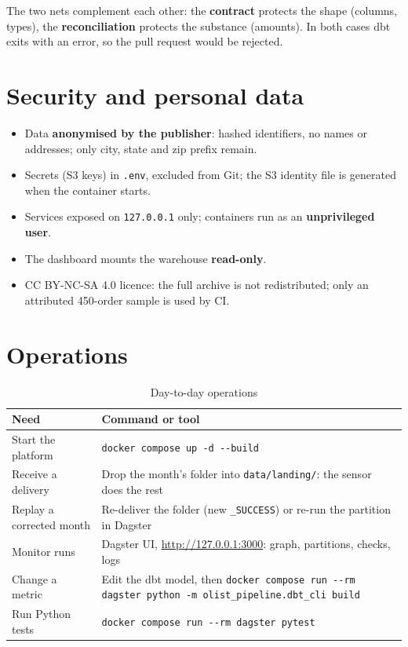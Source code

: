 \documentclass[11pt, a4paper, oneside, headings=normal, numbers=noenddot, DIV=12]{scrartcl}
\begin{document}
The two nets complement each other: the \textbf{contract} protects the shape (columns, types), the \textbf{reconciliation} protects the
substance (amounts). In both cases dbt exits with an error, so the pull request would be rejected.

\section{Security and personal data}
\begin{itemize}[leftmargin=1.2em]
  \item Data \textbf{anonymised by the publisher}: hashed identifiers, no names or addresses; only city, state and zip prefix remain.
  \item Secrets (S3 keys) in \texttt{.env}, excluded from Git; the S3 identity file is generated when the container starts.
  \item Services exposed on \texttt{127.0.0.1} only; containers run as an \textbf{unprivileged user}.
  \item The dashboard mounts the warehouse \textbf{read-only}.
  \item CC BY-NC-SA 4.0 licence: the full archive is not redistributed; only an attributed 450-order sample is used by CI.
\end{itemize}

\section{Operations}
\begin{table}[H]
\centering\small
\begin{tabularx}{\linewidth}{@{}L{4.6cm} Y@{}}
\toprule
\textbf{Need} & \textbf{Command or tool} \\
\midrule
Start the platform & \texttt{docker compose up -d -{}-build} \\
Receive a delivery & Drop the month's folder into \texttt{data/landing/}: the sensor does the rest \\
Replay a corrected month & Re-deliver the folder (new \texttt{\_SUCCESS}) or re-run the partition in Dagster \\
Monitor runs & Dagster UI, \url{http://127.0.0.1:3000}: graph, partitions, checks, logs \\
Change a metric & Edit the dbt model, then \texttt{docker compose run -{}-rm dagster python -m olist\_pipeline.dbt\_cli build} \\
Run Python tests & \texttt{docker compose run -{}-rm dagster pytest} \\
\bottomrule
\end{tabularx}
\caption{Day-to-day operations}
\end{table}
\end{document}
